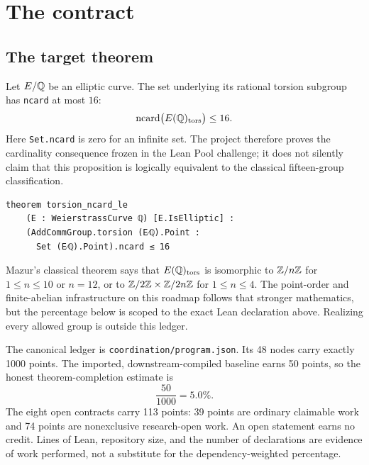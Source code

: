 \chapter{The contract}

\section{The target theorem}

\begin{theorem}\label{thm:mazur}
Let \(E/\mathbb{Q}\) be an elliptic curve.  The set underlying its rational torsion
subgroup has \texttt{ncard} at most \(16\):
\[
 \operatorname{ncard}\bigl(E(\mathbb{Q})_{\mathrm{tors}}\bigr)\leq 16.
\]
Here \texttt{Set.ncard} is zero for an infinite set.  The project therefore
proves the cardinality consequence frozen in the Lean Pool challenge; it does
not silently claim that this proposition is logically equivalent to the
classical fifteen-group classification.
\leanpending
\end{theorem}

\begin{verbatim}
theorem torsion_ncard_le
    (E : WeierstrassCurve ℚ) [E.IsElliptic] :
    (AddCommGroup.torsion (E⁄ℚ).Point :
      Set (E⁄ℚ).Point).ncard ≤ 16
\end{verbatim}

\begin{remark}
Mazur's classical theorem says that \(E(\mathbb{Q})_{\mathrm{tors}}\) is isomorphic
to \(\mathbb{Z}/n\mathbb{Z}\) for \(1\leq n\leq 10\) or \(n=12\), or to
\(\mathbb{Z}/2\mathbb{Z}\times\mathbb{Z}/2n\mathbb{Z}\) for \(1\leq n\leq 4\).  The point-order and
finite-abelian infrastructure on this roadmap follows that stronger
mathematics, but the percentage below is scoped to the exact Lean declaration
above.  Realizing every allowed group is outside this ledger.
\end{remark}

\begin{remark}\label{rem:percentage}
The canonical ledger is \texttt{coordination/program.json}.  Its 48 nodes
carry exactly 1000 points.  The imported, downstream-compiled baseline earns
50 points, so the honest theorem-completion estimate is
\[
  \frac{50}{1000}=5.0\%.
\]
The eight open contracts carry 113 points: 39 points are ordinary claimable
work and 74 points are nonexclusive research-open work.  An open statement
earns no credit.  Lines of Lean, repository size, and the number of
declarations are evidence of work performed, not a substitute for the
dependency-weighted percentage.
\end{remark}

